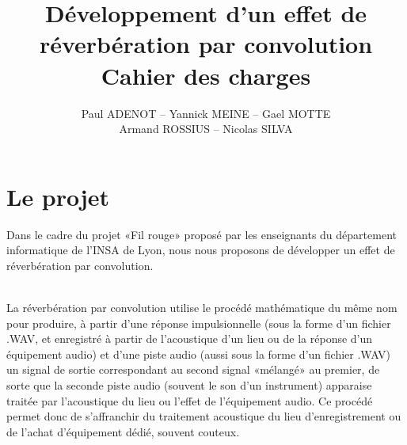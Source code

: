 
\author{Paul ADENOT -- Yannick MEINE -- Gael MOTTE \\ Armand ROSSIUS -- Nicolas SILVA }
\title{D\'{e}veloppement d'un effet de r\'{e}verb\'{e}ration par convolution\\Cahier des charges}


\maketitle
\tableofcontents
\section{Le projet}
Dans le cadre du projet «Fil rouge» proposé par les enseignants du département informatique de l'INSA de Lyon, nous nous proposons de développer un effet de réverbération par convolution.

~\\
%
La réverbération par convolution utilise le procédé mathématique du même nom pour produire, à partir d'une réponse impulsionnelle (sous la forme d'un fichier .WAV, et enregistré à partir de l'acoustique d'un lieu ou de la réponse d'un équipement audio) et d'une piste audio (aussi sous la forme d'un fichier .WAV) un signal de sortie correspondant au second signal «mélangé» au premier, de sorte que la seconde piste audio (souvent le son d'un instrument) apparaise traitée par l'acoustique du lieu ou l'effet de l'équipement audio. Ce procédé permet donc de s'affranchir du traitement acoustique du lieu d'enregistrement ou de l'achat d'équipement dédié, souvent couteux.

